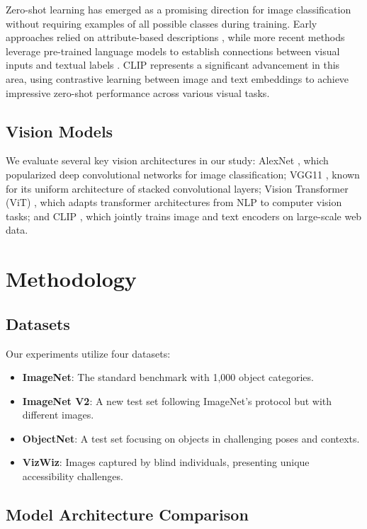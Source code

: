\documentclass[9pt,a4paper,twocolumn,twoside]{tau-class/tau}
\begin{document}
Zero-shot learning has emerged as a promising direction for image classification without requiring examples of all possible classes during training. Early approaches relied on attribute-based descriptions \cite{ZSL1}, while more recent methods leverage pre-trained language models to establish connections between visual inputs and textual labels \cite{ZSL2}. CLIP \cite{CLIP} represents a significant advancement in this area, using contrastive learning between image and text embeddings to achieve impressive zero-shot performance across various visual tasks.

\subsection{Vision Models}

We evaluate several key vision architectures in our study: AlexNet \cite{AlexNet}, which popularized deep convolutional networks for image classification; VGG11 \cite{VGG}, known for its uniform architecture of stacked convolutional layers; Vision Transformer (ViT) \cite{ViT}, which adapts transformer architectures from NLP to computer vision tasks; and CLIP \cite{CLIP}, which jointly trains image and text encoders on large-scale web data.
\section{Methodology}
\subsection{Datasets}

Our experiments utilize four datasets:
\begin{itemize}
    \item \textbf{ImageNet}: The standard benchmark with 1,000 object categories.
    \item \textbf{ImageNet V2}: A new test set following ImageNet's protocol but with different images.
    \item \textbf{ObjectNet}: A test set focusing on objects in challenging poses and contexts.
    \item \textbf{VizWiz}: Images captured by blind individuals, presenting unique accessibility challenges.
\end{itemize}

\subsection{Model Architecture Comparison}
\end{document}
